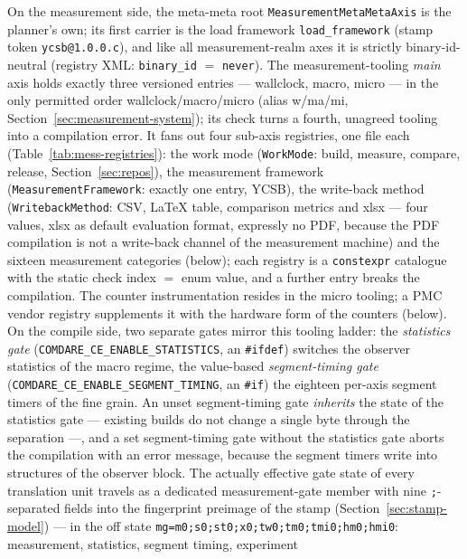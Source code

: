 \begin{nurlang}
On the measurement side, the meta-meta root \texttt{MeasurementMetaMetaAxis} is the planner's own;
its first carrier is the load framework \texttt{load\_framework} (stamp token
\texttt{ycsb@1.0.0.c}), and like all measurement-realm axes it is strictly binary-id-neutral
(registry XML\@: \texttt{binary\_id} $=$ \texttt{never}). The measurement-tooling
\emph{main} axis holds exactly three versioned entries --- wallclock, macro, micro --- in the only
permitted order wallclock/macro/micro (alias w/ma/mi, Section~\ref{sec:measurement-system}); its check
turns a fourth, unagreed tooling into a compilation error. It fans out four sub-axis registries, one
file each (Table~\ref{tab:mess-registries}): the work mode (\texttt{WorkMode}: build, measure, compare,
release, Section~\ref{sec:repos}), the measurement framework (\texttt{MeasurementFramework}: exactly
one entry, YCSB), the write-back method (\texttt{WritebackMethod}: CSV, LaTeX table, comparison metrics
and xlsx --- four values, xlsx as default evaluation format, expressly no PDF, because the PDF
compilation is not a write-back channel of the measurement machine) and the sixteen measurement
categories (below); each registry is a \texttt{constexpr} catalogue with the static check index $=$
enum value, and a further entry breaks the compilation. The counter instrumentation resides in the
micro tooling; a PMC vendor registry supplements it with the hardware form of the counters (below). On
the compile side, two separate gates mirror this tooling ladder: the \emph{statistics gate}
(\texttt{COMDARE\_\allowbreak{}CE\_\allowbreak{}ENABLE\_\allowbreak{}STATISTICS}, an \texttt{\#ifdef})
switches the observer statistics of the macro regime, the value-based \emph{segment-timing gate}
(\texttt{COMDARE\_\allowbreak{}CE\_\allowbreak{}ENABLE\_\allowbreak{}SEGMENT\_\allowbreak{}TIMING}, an
\texttt{\#if}) the eighteen per-axis segment timers of the fine grain. An unset segment-timing gate
\emph{inherits} the state of the statistics gate --- existing builds do not change a single byte
through the separation ---, and a set segment-timing gate without the statistics gate aborts the
compilation with an error message, because the segment timers write into structures of the observer
block. The actually effective gate state of every translation unit travels as a dedicated
measurement-gate member with nine \texttt{;}-separated fields into the fingerprint preimage of the
stamp (Section~\ref{sec:stamp-model}) --- in the off state
\texttt{mg=m0;s0;st0;x0;tw0;tm0;tmi0;hm0;hmi0}: measurement, statistics, segment timing, experiment

\end{nurlang}
